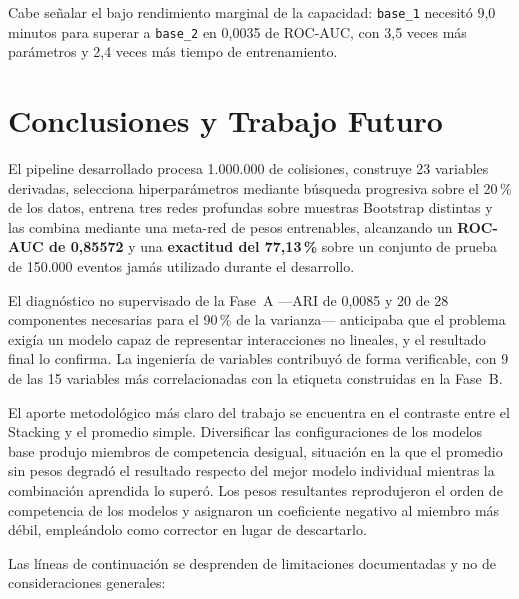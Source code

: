 \documentclass[12pt,a4paper]{article}
\begin{document}
Cabe señalar el bajo rendimiento marginal de la capacidad: \texttt{base\_1} necesitó 9,0 minutos
para superar a \texttt{base\_2} en 0,0035 de ROC-AUC, con 3,5 veces más parámetros y 2,4 veces más
tiempo de entrenamiento.

\section{Conclusiones y Trabajo Futuro}

El pipeline desarrollado procesa 1.000.000 de colisiones, construye 23 variables derivadas,
selecciona hiperparámetros mediante búsqueda progresiva sobre el 20\,\% de los datos, entrena tres
redes profundas sobre muestras Bootstrap distintas y las combina mediante una meta-red de pesos
entrenables, alcanzando un \textbf{ROC-AUC de 0,85572} y una \textbf{exactitud del 77,13\,\%}
sobre un conjunto de prueba de 150.000 eventos jamás utilizado durante el desarrollo.

El diagnóstico no supervisado de la Fase~A ---ARI de 0,0085 y 20 de 28 componentes necesarias para
el 90\,\% de la varianza--- anticipaba que el problema exigía un modelo capaz de representar
interacciones no lineales, y el resultado final lo confirma. La ingeniería de variables contribuyó
de forma verificable, con 9 de las 15 variables más correlacionadas con la etiqueta construidas en
la Fase~B.

El aporte metodológico más claro del trabajo se encuentra en el contraste entre el Stacking y el
promedio simple. Diversificar las configuraciones de los modelos base produjo miembros de
competencia desigual, situación en la que el promedio sin pesos degradó el resultado respecto del
mejor modelo individual mientras la combinación aprendida lo superó. Los pesos resultantes
reprodujeron el orden de competencia de los modelos y asignaron un coeficiente negativo al miembro
más débil, empleándolo como corrector en lugar de descartarlo.

Las líneas de continuación se desprenden de limitaciones documentadas y no de consideraciones
generales:
\end{document}
